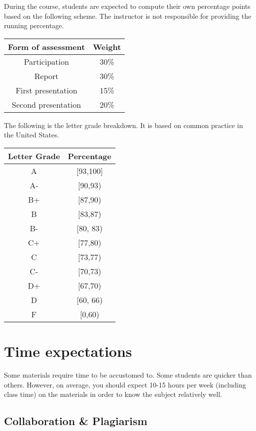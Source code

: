 \documentclass[
  openany]{book}
\begin{document}
During the course, students are expected to compute their own percentage
points based on the following scheme.
The instructor is not responsible for providing the running percentage.

\begin{longtable}[]{@{}cc@{}}
\toprule\noalign{}
\textbf{Form of assessment} & \textbf{Weight} \\
\midrule\noalign{}
\endhead
\bottomrule\noalign{}
\endlastfoot
Participation & 30\% \\
Report & 30\% \\
First presentation & 15\% \\
Second presentation & 20\% \\
\end{longtable}

The following is the letter grade breakdown. It is based on
common practice in the United States.

\begin{longtable}[]{@{}cc@{}}
\toprule\noalign{}
\textbf{Letter Grade} & \textbf{Percentage} \\
\midrule\noalign{}
\endhead
\bottomrule\noalign{}
\endlastfoot
A & {[}93,100{]} \\
A- & {[}90,93) \\
B+ & {[}87,90) \\
B & {[}83,87) \\
B- & {[}80, 83) \\
C+ & {[}77,80) \\
C & {[}73,77) \\
C- & {[}70,73) \\
D+ & {[}67,70) \\
D & {[}60, 66) \\
F & {[}0,60) \\
\end{longtable}

\section*{Time expectations}\label{time-expectations}

Some materials require time to be accustomed to. Some students are quicker than
others. However, on average, you should expect 10-15 hours per week (including class time)
on the materials in order to know the subject relatively well.

\subsection*{Collaboration \& Plagiarism}\label{collaboration-plagiarism}
\end{document}
